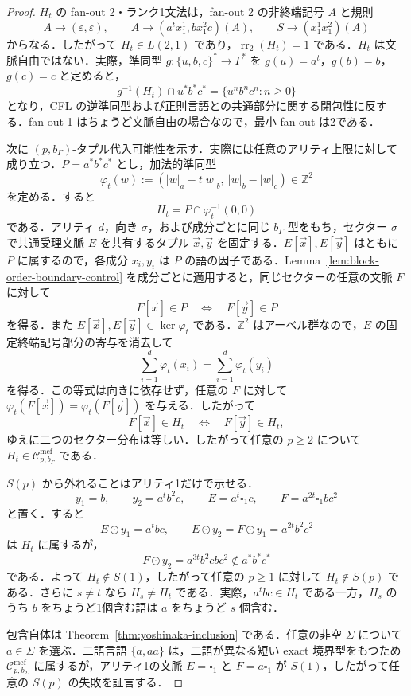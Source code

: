 \documentclass[11pt,a4paper]{ltjsarticle}
\numberwithin{equation}{section}
\theoremstyle{plain}
\theoremstyle{definition}
\theoremstyle{remark}
\newcommand{\Cmcf}[2]{\mathcal{C}^{\mathrm{mcf}}_{#1,#2}}
\newcommand{\tuple}[1]{\vec{#1}}
\newcommand{\blank}{\square}
\newcommand{\eps}{\varepsilon}
\begin{document}
\begin{proof}
$H_t$ の fan-out 2・ランク1文法は，fan-out 2 の非終端記号 $A$ と規則
\[
  A\to(\eps,\eps),\qquad
  A\to(a^t x_1^1,bx_1^2c)(A),\qquad
  S\to(x_1^1x_1^2)(A)
\]
からなる．したがって $H_t\in L(2,1)$ であり，$\operatorname{rr}_2(H_t)=1$ である．$H_t$ は文脈自由ではない．実際，準同型 $g:\{u,b,c\}^*\to\Gamma^*$ を
$g(u)=a^t$，$g(b)=b$，$g(c)=c$ と定めると，
\[
  g^{-1}(H_t)\cap u^*b^*c^*=\{u^nb^nc^n:n\ge0\}
\]
となり，CFL の逆準同型および正則言語との共通部分に関する閉包性に反する．fan-out 1 はちょうど文脈自由の場合なので，最小 fan-out は2である．

次に $(p,b_\Gamma)$-タプル代入可能性を示す．実際には任意のアリティ上限に対して成り立つ．$P=a^*b^*c^*$ とし，加法的準同型
\[
  \varphi_t(w):=(|w|_a-t|w|_b,\ |w|_b-|w|_c)\in\mathbb Z^2
\]
を定める．すると
\[
  H_t=P\cap\varphi_t^{-1}(0,0)
\]
である．アリティ $d$，向き $\sigma$，および成分ごとに同じ $b_\Gamma$ 型をもち，セクター $\sigma$ で共通受理文脈 $E$ を共有するタプル $\tuple x,\tuple y$ を固定する．$E[\tuple x],E[\tuple y]$ はともに $P$ に属するので，各成分 $x_i,y_i$ は $P$ の語の因子である．Lemma~\ref{lem:block-order-boundary-control} を成分ごとに適用すると，同じセクターの任意の文脈 $F$ に対して
\[
  F[\tuple x]\in P\quad\Longleftrightarrow\quad F[\tuple y]\in P
\]
を得る．また $E[\tuple x],E[\tuple y]\in\ker\varphi_t$ である．$\mathbb Z^2$ はアーベル群なので，$E$ の固定終端記号部分の寄与を消去して
\[
  \sum_{i=1}^d\varphi_t(x_i)=
  \sum_{i=1}^d\varphi_t(y_i)
\]
を得る．この等式は向きに依存せず，任意の $F$ に対して
$\varphi_t(F[\tuple x])=\varphi_t(F[\tuple y])$ を与える．したがって
\[
  F[\tuple x]\in H_t\quad\Longleftrightarrow\quad F[\tuple y]\in H_t,
\]
ゆえに二つのセクター分布は等しい．したがって任意の $p\ge2$ について $H_t\in\Cmcf{p}{b_\Gamma}$ である．

$S(p)$ から外れることはアリティ1だけで示せる．
\[
  y_1=b,\qquad y_2=a^tb^2c,
  \qquad E=a^t\blank_1c,
  \qquad F=a^{2t}\blank_1bc^2
\]
と置く．すると
\[
  E\odot y_1=a^tbc,
  \qquad
  E\odot y_2=F\odot y_1=a^{2t}b^2c^2
\]
は $H_t$ に属するが，
\[
  F\odot y_2=a^{3t}b^2cbc^2\notin a^*b^*c^*
\]
である．よって $H_t\notin S(1)$，したがって任意の $p\ge1$ に対して $H_t\notin S(p)$ である．さらに $s\ne t$ なら $H_s\ne H_t$ である．実際，$a^tbc\in H_t$ である一方，$H_s$ のうち $b$ をちょうど1個含む語は $a$ をちょうど $s$ 個含む．

包含自体は Theorem~\ref{thm:yoshinaka-inclusion} である．任意の非空 $\Sigma$ について $a\in\Sigma$ を選ぶ．二語言語 $\{a,aa\}$ は，二語が異なる短い exact 境界型をもつため $\Cmcf{p}{b_\Sigma}$ に属するが，アリティ1の文脈 $E=\blank_1$ と $F=a\blank_1$ が $S(1)$，したがって任意の $S(p)$ の失敗を証言する．
\end{proof}
\end{document}
